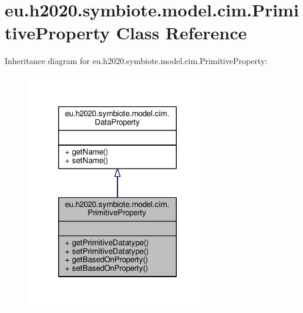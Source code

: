\hypertarget{classeu_1_1h2020_1_1symbiote_1_1model_1_1cim_1_1PrimitiveProperty}{}\section{eu.\+h2020.\+symbiote.\+model.\+cim.\+Primitive\+Property Class Reference}
\label{classeu_1_1h2020_1_1symbiote_1_1model_1_1cim_1_1PrimitiveProperty}


Inheritance diagram for eu.\+h2020.\+symbiote.\+model.\+cim.\+Primitive\+Property\+:
\nopagebreak
\begin{figure}[H]
\begin{center}
\leavevmode
\includegraphics[width=228pt]{classeu_1_1h2020_1_1symbiote_1_1model_1_1cim_1_1PrimitiveProperty__inherit__graph}
\end{center}
\end{figure}


